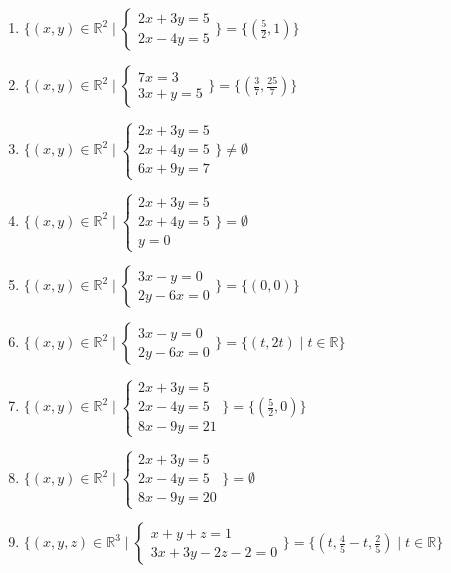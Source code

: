 \documentclass[11pt,a4paper]{article}
\begin{document}
\begin{enumerate}
\item $\displaystyle \{(x, y) \in \mathbb{R}^{2} \mid \begin{cases} 2x + 3y = 5 \\ 2x - 4y = 5 \end{cases}\} = \{(\frac{5}{2}, 1)\}$
\item $\displaystyle \{(x, y) \in \mathbb{R}^{2} \mid \begin{cases} 7x = 3 \\ 3x + y = 5 \end{cases}\} = \{(\frac{3}{7}, \frac{25}{7})\}$
\item $\displaystyle \{(x, y) \in \mathbb{R}^{2} \mid \begin{cases} 2x + 3y = 5 \\ 2x + 4y = 5 \\ 6x + 9y = 7 \end{cases}\} \neq \emptyset$
\item $\displaystyle \{(x, y) \in \mathbb{R}^{2} \mid \begin{cases} 2x + 3y = 5 \\ 2x + 4y = 5 \\ y = 0 \end{cases}\} = \emptyset$
\item $\displaystyle \{(x, y) \in \mathbb{R}^{2} \mid \begin{cases} 3x - y = 0 \\ 2y - 6x = 0 \end{cases}\} = \{(0, 0)\}$
\item $\displaystyle \{(x, y) \in \mathbb{R}^{2} \mid \begin{cases} 3x - y = 0 \\ 2y - 6x = 0 \end{cases}\} = \{(t, 2t) \mid t \in \mathbb{R}\}$
\item $\displaystyle \{(x, y) \in \mathbb{R}^{2} \mid \begin{cases} 2x + 3y = 5 \\ 2x - 4y = 5 \\ 8x - 9y = 21 \end{cases}\} = \{(\frac{5}{2}, 0)\}$
\item $\displaystyle \{(x, y) \in \mathbb{R}^{2} \mid \begin{cases} 2x + 3y = 5 \\ 2x - 4y = 5 \\ 8x - 9y = 20 \end{cases}\} = \emptyset$
\item $\displaystyle \{(x, y, z) \in \mathbb{R}^{3} \mid \begin{cases} x + y + z = 1 \\ 3x + 3y - 2z - 2 = 0 \end{cases}\} = \{(t, \frac{4}{5} - t, \frac{2}{5}) \mid t \in \mathbb{R}\}$

\end{enumerate}
\end{document}
